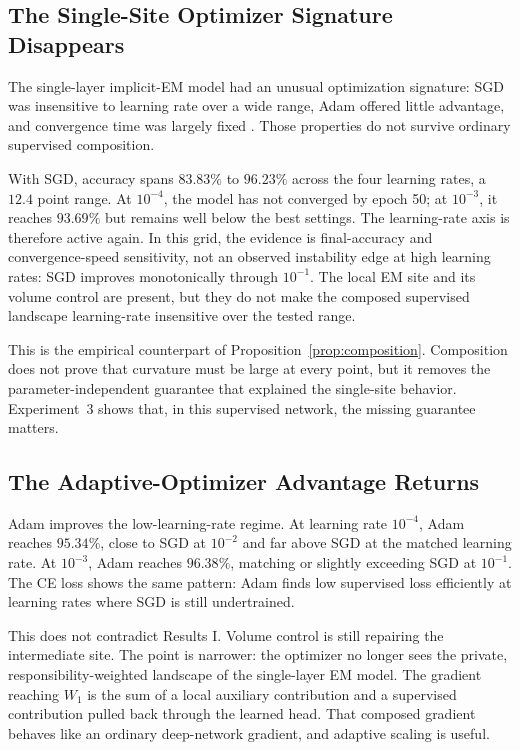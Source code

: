 \subsection{The Single-Site Optimizer Signature Disappears}
The single-layer implicit-EM model had an unusual optimization signature: SGD
was insensitive to learning rate over a wide range, Adam offered little
advantage, and convergence time was largely fixed
\citep{oursland2026decoderfree}. Those properties do not survive ordinary
supervised composition.

With SGD, accuracy spans $83.83\%$ to $96.23\%$ across the four learning
rates, a $12.4$ point range. At $10^{-4}$, the model has not converged by
epoch 50; at $10^{-3}$, it reaches $93.69\%$ but remains well below the best
settings. The learning-rate axis is therefore active again. In this grid, the
evidence is final-accuracy and convergence-speed sensitivity, not an observed
instability edge at high learning rates: SGD improves monotonically through
$10^{-1}$. The local EM site and its volume control are present, but they do
not make the composed supervised landscape learning-rate insensitive over the
tested range.

This is the empirical counterpart of Proposition~\ref{prop:composition}.
Composition does not prove that curvature must be large at every point, but it
removes the parameter-independent guarantee that explained the single-site
behavior. Experiment~3 shows that, in this supervised network, the missing
guarantee matters.

\subsection{The Adaptive-Optimizer Advantage Returns}
Adam improves the low-learning-rate regime. At learning rate $10^{-4}$, Adam
reaches $95.34\%$, close to SGD at $10^{-2}$ and far above SGD at the matched
learning rate. At $10^{-3}$, Adam reaches $96.38\%$, matching or slightly
exceeding SGD at $10^{-1}$. The CE loss shows the same pattern: Adam finds low
supervised loss efficiently at learning rates where SGD is still undertrained.

This does not contradict Results I. Volume control is still repairing the
intermediate site. The point is narrower: the optimizer no longer sees the
private, responsibility-weighted landscape of the single-layer EM model. The
gradient reaching $W_1$ is the sum of a local auxiliary contribution and a
supervised contribution pulled back through the learned head. That composed
gradient behaves like an ordinary deep-network gradient, and adaptive scaling
is useful.

